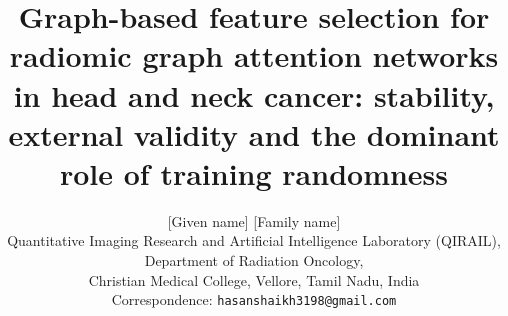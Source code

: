\documentclass[11pt,a4paper]{article}
\begin{document}
\title{\vspace{-1.2cm}\Large\textbf{Graph-based feature selection for radiomic graph attention networks in head and neck cancer: stability, external validity and the dominant role of training randomness}}
\author{\normalsize [Given name] [Family name]\\[2pt]
\small Quantitative Imaging Research and Artificial Intelligence Laboratory (QIRAIL), Department of Radiation Oncology,\\
\small Christian Medical College, Vellore, Tamil Nadu, India\\
\small Correspondence: \texttt{hasanshaikh3198@gmail.com}}
\date{}

\maketitle
\vspace{-0.8cm}
\end{document}
